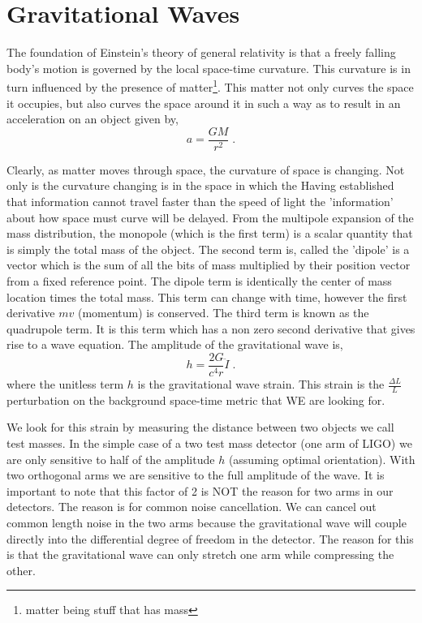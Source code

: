 \acresetall



\section{Gravitational Waves}

The foundation of Einstein's theory of general relativity is that a freely
falling body's motion is governed by the local space-time curvature.
This curvature is in turn influenced by the presence of
matter\footnote{matter being stuff that has mass}.
This matter not only curves the space it occupies, but also curves the space
around it in such a way as to result in an acceleration on an object given by,
\begin{equation}
a = \frac{GM}{r^2} \;.
\end{equation}

Clearly, as matter moves through space, the curvature of space is changing.
Not only is the curvature changing is in the space in which the 
Having established that information cannot travel faster than the speed of light
the 'information' about how space must curve will be delayed.
From the multipole expansion of the mass distribution, the monopole (which is
the first term) is a scalar quantity that is simply the total
mass of the object.
The second term is, called the 'dipole' is a vector which is the sum of all the
bits of mass multiplied by their position vector from a fixed reference point.
The dipole term is identically the center of mass location times the total mass.
This term can change with time, however the first derivative $mv$ (momentum)
is conserved.
The third term is known as the quadrupole term.
It is this term which has a non zero second derivative that gives rise to a
wave equation.
The amplitude of the gravitational wave is,
\begin{equation}
h = \frac{2G}{c^4r}\ddot I \;.
\end{equation}
where the unitless term $h$ is the gravitational wave strain.
This strain is the $\frac{\Delta L}{L}$ perturbation on the background
space-time metric that WE are looking for.

We look for this strain by measuring the distance between two objects we call
test masses.
In the simple case of a two test mass detector (one arm of LIGO) we are only
sensitive to half of the amplitude $h$ (assuming optimal orientation).
With two orthogonal arms we are sensitive to the full amplitude of the wave.
It is important to note that this factor of 2 is NOT the reason for two arms
in our detectors.
The reason is for common noise cancellation.
We can cancel out common length noise in the two arms because the gravitational
wave will couple directly into the differential degree of freedom in the
detector.
The reason for this is that the gravitational wave can only stretch one arm
while compressing the other.

